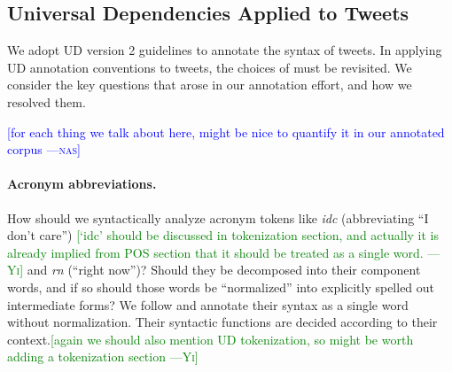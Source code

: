 \documentclass[11pt,a4paper]{article}
\newcommand{\yjcomment}[1]{\textcolor{orange}{[$_\mathrm{L}^\mathrm{Y}$#1]}}
\newcommand{\nascomment}[1]{\textcolor{blue}{[#1 ---\textsc{nas}]}}
\newcommand{\yicomment}[1]{\textcolor{green}{[#1 ---\textsc{Yi}]}}
\begin{document}
\subsection{Universal Dependencies Applied to Tweets}

We adopt UD version 2 guidelines to annotate the syntax of tweets.
In applying UD annotation conventions to tweets, the choices of 
 must be revisited.  We consider the
key questions that arose in our annotation effort, and how we resolved them.

\nascomment{for each thing we talk about here, might be nice to
  quantify it in our annotated corpus}




\paragraph{Acronym abbreviations.}  How should we syntactically
analyze acronym tokens like \emph{idc}
(abbreviating ``I don't care'') \yicomment{`idc' should be discussed in tokenization section, and actually it is already implied from POS section that it should be treated as a single word.}
 and \emph{rn} (``right now'')?  Should
they be decomposed into their component words, and if so should those
words be ``normalized'' into explicitly spelled out intermediate
forms? We follow \citet{kong-EtAl:2014:EMNLP2014} and annotate their
syntax as a single word without normalization. Their syntactic functions
are decided according to their context.\yicomment{again we should also mention UD tokenization, so might be worth adding a tokenization section}
\end{document}
